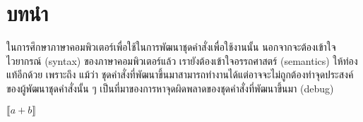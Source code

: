 \chapter{บทนำ}
%
\par{
ในการศึกษาภาษาคอมพิวเตอร์เพื่อใช้ในการพัฒนาชุดคำสั่งเพื่อใช้งานนั้น
นอกจากจะต้องเข้าใจไวยากรณ์ (syntax) ของภาษาคอมพิวเตอร์แล้ว 
เรายังต้องเข้าใจอรรถศาสตร์ (semantics) ให้ท่องแท้อีกด้วย เพราะถึง
แม้ว่า ชุดคำสั่งที่พัฒนาขึ้นมาสามารถทำงานได้แต่อาจจะไม่ถูกต้องทำจุดประสงค์
ของผู้พัฒนาชุดคำสั่งนั้น ๆ เป็นที่มาของการหาจุดผิดพลาดของชุดคำสั่งที่พัฒนาขึ้นมา (debug)
}

\par{
$\llbracket a+b \rrbracket$
}
